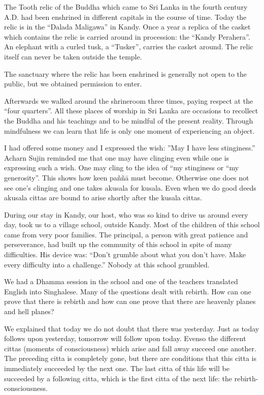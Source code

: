 The Tooth relic of the Buddha which came to Sri Lanka in the fourth
century A.D. had been enshrined in different capitals in the course of
time. Today the relic is in the ``Dalada Maligawa'' in Kandy. Once a
year a replica of the casket which contains the relic is carried around
in procession: the ``Kandy Perahera''. An elephant with a curled tusk, a
``Tusker'', carries the casket around. The relic itself can never be
taken outside the temple.

The sanctuary where the relic has been enshrined is generally not open
to the public, but we obtained permission to enter.

Afterwards we walked around the shrineroom three times, paying respect
at the ``four quarters''. All these places of worship in Sri Lanka are
occasions to recollect the Buddha and his teachings and to be mindful of
the present reality. Through mindfulness we can learn that life is only
one moment of experiencing an object.

I had offered some money and I expressed the wish: ''May I have less
stinginess.'' Acharn Sujin reminded me that one may have clinging even
while one is expressing such a wish. One may cling to the idea of ``my
stinginess or ``my generosity''. This shows how keen paññā must become.
Otherwise one does not see one's clinging and one takes akusala for
kusala. Even when we do good deeds akusala cittas are bound to arise
shortly after the kusala cittas.

During our stay in Kandy, our host, who was so kind to drive us around
every day, took us to a village school, outside Kandy. Most of the
children of this school came from very poor families. The principal, a
person with great patience and perseverance, had built up the community
of this school in spite of many difficulties. His device was: ``Don't
grumble about what you don't have. Make every difficulty into a
challenge.'' Nobody at this school grumbled.

We had a Dhamma session in the school and one of the teachers translated
English into Singhalese. Many of the questions dealt with rebirth. How
can one prove that there is rebirth and how can one prove that there are
heavenly planes and hell planes?

We explained that today we do not doubt that there was yesterday. Just
as today follows upon yesterday, tomorrow will follow upon today. Evenso
the different cittas (moments of consciousness) which arise and fall
away succeed one another. The preceding citta is completely gone, but
there are conditions that this citta is immediately succeeded by the
next one. The last citta of this life will be succeeded by a following
citta, which is the first citta of the next life: the
rebirth-consciousness.

